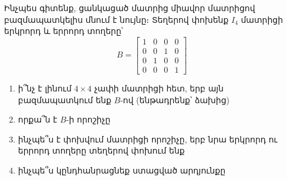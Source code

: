 \begin{problem}
Ինչպես գիտենք, ցանկացած մատրից միավոր մատրիցով բազմապատկելիս մնում է նույնը։ Տեղերով փոխենք $I_4$ մատրիցի երկրորդ և երրորդ տողերը՝
\[
B = \begin{bmatrix}
    1 & 0 & 0 & 0 \\
    0 & 0 & 1 & 0 \\
    0 & 1 & 0 & 0 \\
    0 & 0 & 0 & 1
\end{bmatrix}
\]
\begin{enumerate}[label={\alph*}․]
\item ի՞նչ է լինում $4 \times 4$ չափի մատրիցի հետ, երբ այն բազմապատկում ենք $B$-ով (ենթադրենք՝ ձախից)

\item որքա՞ն է $B$-ի որոշիչը

\item ինչպե՞ս է փոխվում մատրիցի որոշիչը, երբ նրա երկրորդ ու երրորդ տողերը տեղերով փոխում ենք

\item ինչպե՞ս կընդհանրացնեք ստացված արդյունքը
\end{enumerate}
\end{problem}
